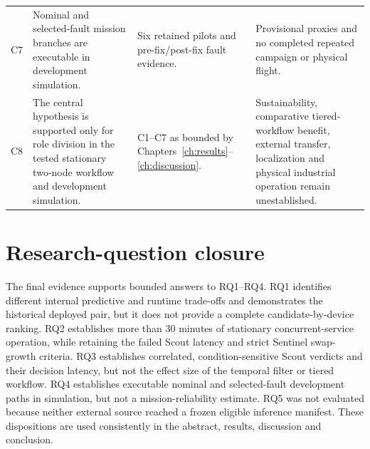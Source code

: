{\begin{longtable}{@{}p{}p{}p{}p{}@{}}
  C7 & Nominal and selected-fault mission branches are executable in development
  simulation. & Six retained pilots and pre-fix/post-fix fault evidence. &
  Provisional proxies and no completed repeated campaign or physical flight. \\

  C8 & The central hypothesis is supported only for role division in the tested
  stationary two-node workflow and development simulation. & C1--C7 as bounded
  by Chapters~\ref{ch:results}--\ref{ch:discussion}. & Sustainability,
  comparative tiered-workflow benefit, external transfer, localization and physical
  industrial operation remain unestablished. \\
\end{longtable}
}

\section{Research-question closure}

The final evidence supports bounded answers to RQ1--RQ4. RQ1 identifies
different internal predictive and runtime trade-offs and demonstrates the
historical deployed pair, but it does not provide a complete candidate-by-device
ranking. RQ2 establishes more than 30 minutes of stationary concurrent-service
operation, while retaining the failed Scout latency and strict Sentinel
swap-growth criteria. RQ3 establishes correlated, condition-sensitive Scout
verdicts and their decision latency, but not the effect size of the temporal
filter or tiered workflow. RQ4 establishes executable nominal and selected-fault
development paths in simulation, but not a mission-reliability estimate. RQ5
was not evaluated because neither external source reached a frozen eligible
inference manifest. These dispositions are used consistently in the abstract,
results, discussion and conclusion.
